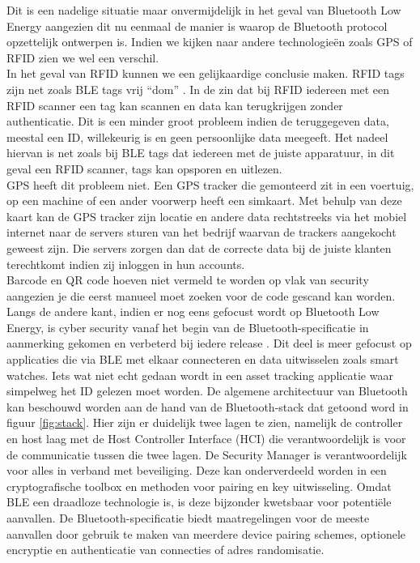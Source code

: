 Dit is een nadelige situatie maar onvermijdelijk in het geval van Bluetooth Low Energy aangezien dit nu eenmaal de manier is waarop de Bluetooth protocol opzettelijk ontwerpen is. Indien we kijken naar andere technologieën zoals GPS of RFID zien we wel een verschil.\\

In het geval van RFID kunnen we een gelijkaardige conclusie maken. RFID tags zijn net zoals BLE tags vrij “dom” \autocite{Juels2006}. In de zin dat bij RFID iedereen met een RFID scanner een tag kan scannen en data kan terugkrijgen zonder authenticatie. Dit is een minder groot probleem indien de teruggegeven data, meestal een ID, willekeurig is en geen persoonlijke data meegeeft. Het nadeel hiervan is net zoals bij BLE tags dat iedereen met de juiste apparatuur, in dit geval een RFID scanner, tags kan opsporen en uitlezen.\\

GPS heeft dit probleem niet. Een GPS tracker die gemonteerd zit in een voertuig, op een machine of een ander voorwerp heeft een simkaart. Met behulp van deze kaart kan de GPS tracker zijn locatie en andere data rechtstreeks via het mobiel internet naar de servers sturen van het bedrijf waarvan de trackers aangekocht geweest zijn. Die servers zorgen dan dat de correcte data bij de juiste klanten terechtkomt indien zij inloggen in hun accounts. \\

Barcode en QR code hoeven niet vermeld te worden op vlak van security aangezien je die eerst manueel moet zoeken voor de code gescand kan worden. \\

Langs de andere kant, indien er nog eens gefocust wordt op Bluetooth Low Energy, is cyber security vanaf het begin van de Bluetooth-specificatie in aanmerking gekomen en verbeterd bij iedere release \autocite{Caesar2022}. Dit deel is meer gefocust op applicaties die via BLE met elkaar connecteren en data uitwisselen zoals smart watches. Iets wat niet echt gedaan wordt in een asset tracking applicatie waar simpelweg het ID gelezen moet worden. De algemene architectuur van Bluetooth kan beschouwd worden aan de hand van de Bluetooth-stack dat getoond word in figuur \ref{fig:stack}. Hier zijn er duidelijk twee lagen te zien, namelijk de controller en host laag met de Host Controller Interface (HCI) die verantwoordelijk is voor de communicatie tussen die twee lagen. De Security Manager is verantwoordelijk voor alles in verband met beveiliging. Deze kan onderverdeeld worden in een cryptografische toolbox en methoden voor pairing en key uitwisseling. Omdat BLE een draadloze technologie is, is deze bijzonder kwetsbaar voor potentiële aanvallen. De Bluetooth-specificatie biedt maatregelingen voor de meeste aanvallen door gebruik te maken van meerdere device pairing schemes, optionele encryptie en authenticatie van connecties of adres randomisatie.

